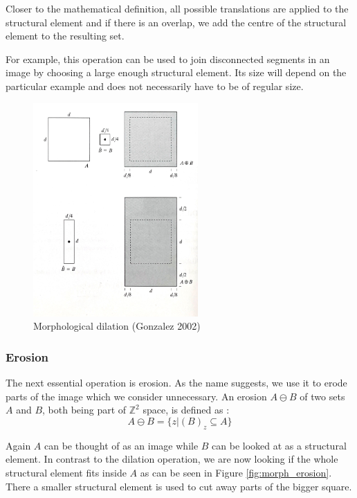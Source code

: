 \documentclass[
  digital,     %
  oneside,     %
  nosansbold,  %
  nocolorbold, %
  lof,         %
  lot,         %
]{fithesis4}
\newcommand*{\Z}{\ensuremath{\mathbb{Z}}}
\begin{document}
Closer to the mathematical definition, all possible translations are applied to
the structural element and if there is an overlap, we add the centre of the
structural element to the resulting set.

For example, this operation can be used to join disconnected segments in an
image by choosing a large enough structural element. Its size will depend on the
particular example and does not necessarily have to be of regular size.

\begin{figure}
    \begin{center}
        \includegraphics[width=6.3cm]{resources/morph_dilation.jpg}
    \end{center}
    \caption{Morphological dilation (Gonzalez 2002)} %
    \label{fig:morph_dilation}
\end{figure}

\subsubsection{Erosion}

The next essential operation is erosion. As the name suggests, we use it to
erode parts of the image which we consider unnecessary. An erosion $A \ominus B$
of two sets $A$ and $B$, both being part of $\Z^2$ space, is defined as
\cite{gonzalez2002}: $$A \ominus B = \{z | (B)_z \subseteq A\}$$

Again $A$ can be thought of as an image while $B$ can be looked at as a
structural element. In contrast to the dilation operation, we are now looking if
the whole structural element fits inside $A$ as can be seen in Figure
\ref{fig:morph_erosion}. There a smaller structural element is used to cut away
parts of the bigger square.
\end{document}

